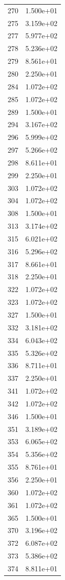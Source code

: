 \documentclass[12pt]{article}
\begin{document}
\begin{longtable}{@{}cc@{}}
270 & 1.500e+01 \\
275 & 3.159e+02 \\
277 & 5.977e+02 \\
278 & 5.236e+02 \\
279 & 8.561e+01 \\
280 & 2.250e+01 \\
284 & 1.072e+02 \\
285 & 1.072e+02 \\
289 & 1.500e+01 \\
294 & 3.167e+02 \\
296 & 5.999e+02 \\
297 & 5.266e+02 \\
298 & 8.611e+01 \\
299 & 2.250e+01 \\
303 & 1.072e+02 \\
304 & 1.072e+02 \\
308 & 1.500e+01 \\
313 & 3.174e+02 \\
315 & 6.021e+02 \\
316 & 5.296e+02 \\
317 & 8.661e+01 \\
318 & 2.250e+01 \\
322 & 1.072e+02 \\
323 & 1.072e+02 \\
327 & 1.500e+01 \\
332 & 3.181e+02 \\
334 & 6.043e+02 \\
335 & 5.326e+02 \\
336 & 8.711e+01 \\
337 & 2.250e+01 \\
341 & 1.072e+02 \\
342 & 1.072e+02 \\
346 & 1.500e+01 \\
351 & 3.189e+02 \\
353 & 6.065e+02 \\
354 & 5.356e+02 \\
355 & 8.761e+01 \\
356 & 2.250e+01 \\
360 & 1.072e+02 \\
361 & 1.072e+02 \\
365 & 1.500e+01 \\
370 & 3.196e+02 \\
372 & 6.087e+02 \\
373 & 5.386e+02 \\
374 & 8.811e+01 \\

\end{longtable}
\end{document}
